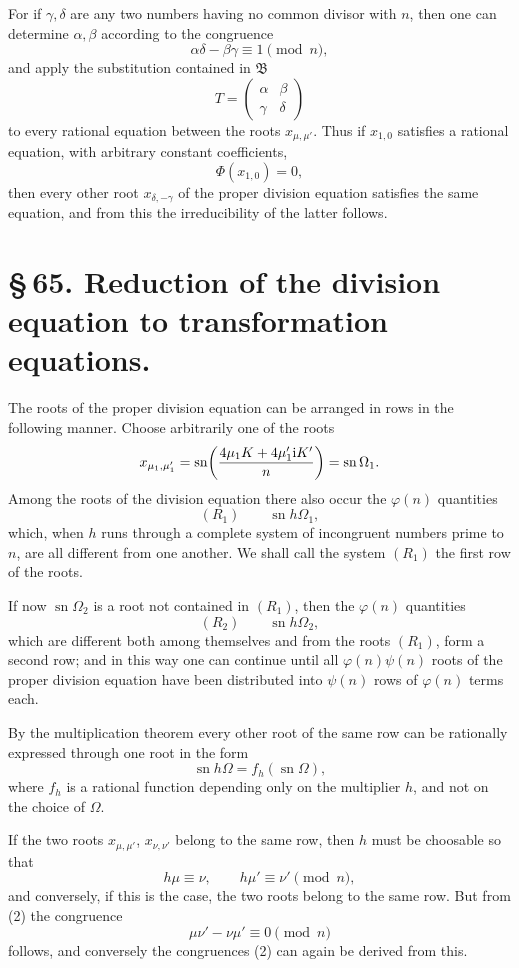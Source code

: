 \documentclass[11pt]{article}
\providecommand{\sn}{\operatorname{sn}}
\providecommand{\ii}{\mathrm{i}}
\begin{document}
For if $\gamma,\delta$ are any two numbers having no common divisor with $n$, then one can
determine $\alpha,\beta$ according to the congruence
\[
 \alpha\delta-\beta\gamma\equiv1\pmod n,
\]
and apply the substitution contained in $\mathfrak B$
\[
 T=\begin{pmatrix}\alpha&\beta\\ \gamma&\delta\end{pmatrix}
\]
to every rational equation between the roots $x_{\mu,\mu'}$. Thus if $x_{1,0}$ satisfies a
rational equation, with arbitrary constant coefficients,
\[
 \Phi(x_{1,0})=0,
\]
then every other root $x_{\delta,-\gamma}$ of the proper division equation satisfies the same
equation, and from this the irreducibility of the latter follows.

\section*{\S\,65. Reduction of the division equation to transformation equations.}

The roots of the proper division equation can be arranged in rows in the following manner.
Choose arbitrarily one of the roots
\[
 x_{\mu_1,\mu'_1}=
 \sn\!\left({4\mu_1K+4\mu'_1\ii K'\over n}\right)=\sn\Omega_1.
\]
Among the roots of the division equation there also occur the $\varphi(n)$ quantities
\[
 (R_1)\qquad \sn h\Omega_1,
\]
which, when $h$ runs through a complete system of incongruent numbers prime to $n$, are
all different from one another. We shall call the system $(R_1)$ the first row of the roots.

If now $\sn\Omega_2$ is a root not contained in $(R_1)$, then the $\varphi(n)$ quantities
\[
 (R_2)\qquad \sn h\Omega_2,
\]
which are different both among themselves and from the roots $(R_1)$, form a second row;
and in this way one can continue until all $\varphi(n)\psi(n)$ roots of the proper division
equation have been distributed into $\psi(n)$ rows of $\varphi(n)$ terms each.

By the multiplication theorem every other root of the same row can be rationally expressed
through one root in the form
\begin{equation}
 \sn h\Omega=f_h(\sn\Omega),
\tag{1}
\end{equation}
where $f_h$ is a rational function depending only on the multiplier $h$, and not on the
choice of $\Omega$.

If the two roots $x_{\mu,\mu'}$, $x_{\nu,\nu'}$ belong to the same row, then $h$ must be
choosable so that
\begin{equation}
 h\mu\equiv\nu,
 \qquad h\mu'\equiv\nu'\pmod n,
\tag{2}
\end{equation}
and conversely, if this is the case, the two roots belong to the same row. But from (2) the
congruence
\begin{equation}
 \mu\nu'-\nu\mu'\equiv0\pmod n
\tag{3}
\end{equation}
follows, and conversely the congruences (2) can again be derived from this.
\end{document}

